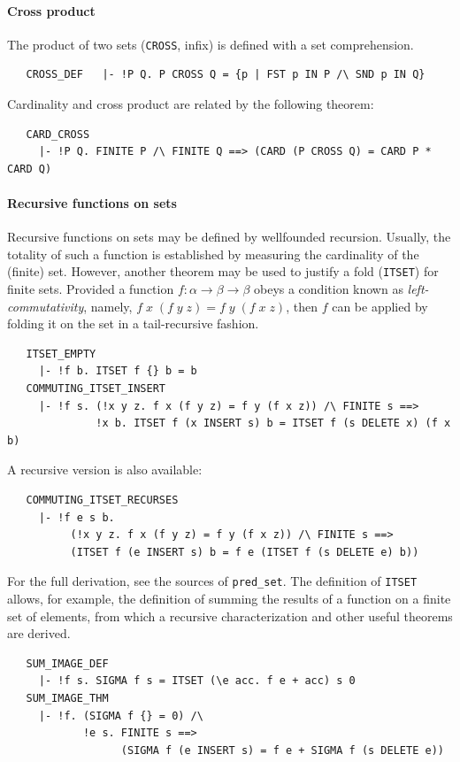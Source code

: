 {\paragraph{Cross product}
The product of two sets ({\small\verb+CROSS+}, infix) is defined
with a set comprehension.
%
\begin{hol}
\begin{verbatim}
   CROSS_DEF   |- !P Q. P CROSS Q = {p | FST p IN P /\ SND p IN Q}
\end{verbatim}
\end{hol}
%
\noindent Cardinality and cross product are related by the following theorem:
\begin{hol}
\begin{verbatim}
   CARD_CROSS
     |- !P Q. FINITE P /\ FINITE Q ==> (CARD (P CROSS Q) = CARD P * CARD Q)
\end{verbatim}
\end{hol}

\paragraph{Recursive functions on sets}

Recursive functions on sets may be defined by wellfounded
recursion. Usually, the totality of such a function is established by
measuring the cardinality of the (finite) set. However, another
theorem may be used to justify a fold ({\small\verb+ITSET+}) for finite sets.
Provided a function $f:\alpha\to\beta\to\beta$ obeys a condition
known as \emph{left-commutativity}, namely, $f\;x\;(f\;y\;z) =
f\;y\;(f\;x\;z)$, then $f$ can be applied by folding it on the set
in a tail-recursive fashion.
\begin{hol}
\begin{verbatim}
   ITSET_EMPTY
     |- !f b. ITSET f {} b = b
   COMMUTING_ITSET_INSERT
     |- !f s. (!x y z. f x (f y z) = f y (f x z)) /\ FINITE s ==>
              !x b. ITSET f (x INSERT s) b = ITSET f (s DELETE x) (f x b)
\end{verbatim}
\end{hol}
A recursive version is also available:
\begin{hol}
\begin{verbatim}
   COMMUTING_ITSET_RECURSES
     |- !f e s b.
          (!x y z. f x (f y z) = f y (f x z)) /\ FINITE s ==>
          (ITSET f (e INSERT s) b = f e (ITSET f (s DELETE e) b))
\end{verbatim}
\end{hol}
For the full derivation, see the sources of {\small\verb+pred_set+}.
The definition of {\small\verb+ITSET+} allows, for example, the
definition of summing the results of a function on a finite set of
elements, from which a recursive characterization and other useful
theorems are derived.
%
\begin{hol}
\begin{verbatim}
   SUM_IMAGE_DEF
     |- !f s. SIGMA f s = ITSET (\e acc. f e + acc) s 0
   SUM_IMAGE_THM
     |- !f. (SIGMA f {} = 0) /\
            !e s. FINITE s ==>
                  (SIGMA f (e INSERT s) = f e + SIGMA f (s DELETE e))
\end{verbatim}
\end{hol}

}
